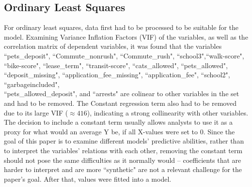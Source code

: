 \documentclass[12pt]{report}
\begin{document}
\subsection{Ordinary Least Squares}
For ordinary least squares, data first had to be processed to be suitable for the model. Examining Variance Inflation Factors (VIF) of the variables, as well as the correlation matrix of dependent variables, it was found that the variables ``pets\_deposit", ``Commute\_nonrush", ``Commute\_rush", ``school3",``walk-score", ``bike-score", ``lease\_term", ``transit-score", ``cats\_allowed", ``pets\_allowed", ``deposit\_missing", ``application\_fee\_missing", ``application\_fee", ``school2", ``garbageincluded", \\ ``pets\_allowed\_deposit", and ``arrests" are colinear to other variables in the set and had to be removed. The Constant regression term also had to be removed due to its large VIF ($\approx416$), indicating a strong collinearity with other variables. The decision to include a constant term usually allows analysts to use it as a proxy for what would an average Y be, if all X-values were set to 0. Since the goal of this paper is to examine different models' predictive abilities, rather than to interpret the variables' relations with each other, removing the constant term should not pose the same difficulties as it normally would -- coefficients that are harder to interpret and are more ``synthetic" are not a relevant challenge for the paper's goal. After that, values were fitted into a model.
\end{document}
